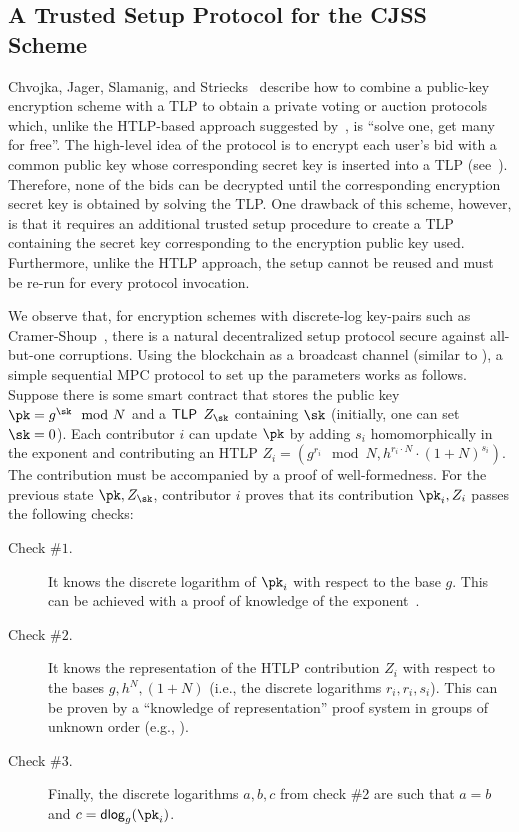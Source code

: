 \subsection{A Trusted Setup Protocol for the CJSS Scheme}\label{sec:seq_mpc_tlp}

Chvojka, Jager, Slamanig, and Striecks~\cite{ESORICS:CJSS21} describe how to combine a public-key encryption scheme with a TLP to obtain a private voting or auction protocols which, unlike the HTLP-based approach suggested by~\cite{C:MalThy19}, is ``solve one, get many for free''. The high-level idea of the protocol is to encrypt each user's bid with a common public key whose corresponding secret key is inserted into a TLP (see~). Therefore, none of the bids can be decrypted until the corresponding encryption secret key is obtained by solving the TLP. One drawback of this scheme, however, is that it requires an additional trusted setup procedure to create a TLP containing the secret key corresponding to the encryption public key used. Furthermore, unlike the HTLP approach, the setup cannot be reused and must be re-run for every protocol invocation.




We observe that, for encryption schemes with discrete-log key-pairs such as Cramer-Shoup~\cite{C:CraSho98}, there is a natural decentralized setup protocol secure against all-but-one corruptions. Using the blockchain as a broadcast channel (similar to \cite{ACNS:NRBB24}), a simple sequential MPC protocol to set up the parameters works as follows. Suppose there is some smart contract that stores the public key $\pk=g^{\sk} \mod{N}$ and a $\mathsf{TLP}$ $Z_{\sk}$ containing $\sk$ (initially, one can set $\sk = 0$). Each contributor $i$ can update $\pk$ by adding $s_i$ homomorphically in the exponent and contributing an HTLP $Z_i=(g^{r_i}\mod{N},h^{r_i\cdot N}\cdot(1+N)^{s_i})$. The contribution must be accompanied by a proof of well-formedness. For the previous state $\pk, Z_{\sk}$, contributor $i$ proves that its contribution $\pk_i, Z_i$ passes the following checks:

\begin{description}
    \item[Check $\#1$.] It knows the discrete logarithm of $\pk_i$ with respect to the base $g$. This can be achieved with a proof of knowledge of the exponent~\cite{C:Schnorr89}.
    \item[Check $\#2$.]\label{item:check2} It knows the representation of the HTLP contribution $Z_i$ with respect to the bases $g, h^N, (1+N)$ (i.e., the discrete logarithms $r_i, r_i, s_i$). This can be proven by a ``knowledge of representation'' proof system in groups of unknown order (e.g., \cite{C:BonBunFis19}).
    \item[Check $\#3$.] Finally, the discrete logarithms $a,b,c$ from check \#2 are such that $a=b$ and $c={\sf dlog}_g(\pk_i)$.
\end{description}

